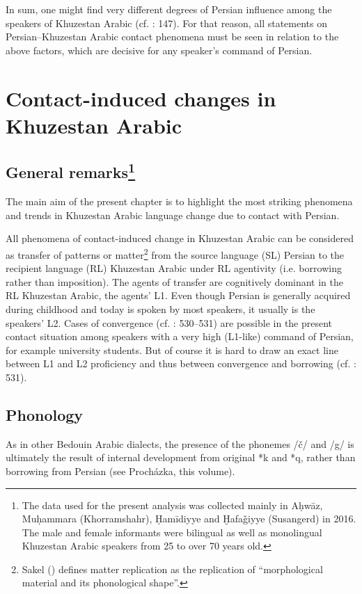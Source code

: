 \documentclass[output=paper,nonflat]{langsci/langscibook}
\begin{document}
In sum, one might find very different degrees of Persian influence among the speakers of Khuzestan Arabic (cf. \citealt{MatrasShabibi2007}: 147). For that reason, all statements on Persian–Khuzestan Arabic contact phenomena must be seen in relation to the above factors, which are decisive for any speaker’s command of Persian. 


\section{Contact-induced changes in Khuzestan Arabic} 
\subsection{General remarks\footnote{\textnormal{The data used for the present analysis was collected mainly in Aḥwāz, Muḥammara (Khorramshahr), Ḥamīdiyye and Ḫafaǧiyye (Susangerd) in 2016. The male and female informants were bilingual as well as monolingual Khuzestan Arabic speakers from 25 to over 70 years old.}}}
The main aim of the present chapter is to highlight the most striking phenomena and trends in Khuzestan Arabic language change due to contact with Persian.

All phenomena of contact-induced change in Khuzestan Arabic can be considered as transfer of patterns or matter\footnote{Sakel (\citeyear[15]{Sakel2007}) defines matter replication as the replication of “morphological material and its phonological shape”.} from the source language (SL) Persian to the recipient language (RL) Khuzestan Arabic under RL agentivity (i.e. borrowing rather than imposition).{} The agents of transfer are cognitively dominant in the RL Khuzestan Arabic, the agents’ L1. Even though Persian is generally acquired during childhood and today is spoken by most speakers, it usually is the speakers’ L2. Cases of convergence (cf. \citealt{Lucas2015}: 530–531) are possible in the present contact situation among speakers with a very high (L1-like) command of Persian, for example university students. But of course it is hard to draw an exact line between L1 and L2 proficiency and thus between convergence and borrowing (cf. \citealt{Lucas2015}: 531). 



\subsection{Phonology}
As in other Bedouin Arabic dialects, the presence of the phonemes /č/ and /g/ is ultimately the result of internal development from original *k and *q, rather than borrowing from Persian (see Procházka, this volume).
\end{document}
